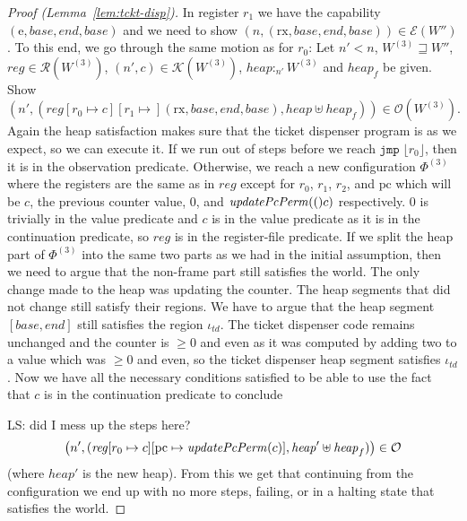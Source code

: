 \documentclass[a4paper]{article}
\newcommand{\update}[2]{[#1 \mapsto #2]}
\newcommand\lau[1]{{\color{purple} \sf \footnotesize {LS: #1}}\\}
\newcommand{\var}[1]{\mathit{#1}}
\newcommand{\pcreg}{\mathrm{pc}}
\newcommand{\reg}{\var{reg}}
\newcommand{\heap}{\var{heap}}
\newcommand{\plainfun}[2]{
  \ifthenelse{\equal{#2}{}}
             {\mathit{#1}}
             {\mathit{#1}(#2)}
}
\newcommand{\updatePcPerm}[1]{\plainfun{updatePcPerm}{#1}}
\newcommand{\future}{\mathbin{\sqsupseteq}}
\newcommand{\heapSat}[3][\heap]{#1 :_{#2} #3}
\newcommand{\asmType}{\plaindom{AsmType}}
\newcommand{\plaindom}[1]{\mathrm{#1}}
\newcommand{\intr}[2]{\mathcal{#1}}
\newcommand{\exprintr}[1]{\intr{E}{#1}}
\newcommand{\contintr}[1]{\intr{K}{#1}}
\newcommand{\regintr}[1]{\intr{R}{#1}}
\newcommand{\stder}{\exprintr{\asmType}}
\newcommand{\stdrr}{\regintr{\asmType}}
\newcommand{\stdkr}{\contintr{\asmType}}
\newcommand{\observations}{\mathcal{O}}
\newcommand{\npair}[2][n]{\left(#1,#2 \right)}
\newcommand{\refreg}[1]{\lfloor #1 \rfloor}
\newcommand{\zinstr}[1]{\mathtt{#1}}
\newcommand{\oneinstr}[2]{\zinstr{#1} \; #2}
\newcommand{\jmp}[1]{\oneinstr{jmp}{#1}}
\newcommand{\plainperm}[1]{\mathrm{#1}}
\newcommand{\exec}{\plainperm{rx}}
\newcommand{\entry}{\plainperm{e}}
\begin{document}
\begin{proof}[Proof (Lemma~\ref{lem:tckt-disp})]
In register $r_1$ we have the capability $(\entry,\var{base},\var{end},\var{base})$ and we need to show $\npair[n]{(\exec,\var{base},\var{end},\var{base})} \in \stder(W'')$. To this end, we go through the same motion as for $r_0$:  Let $n' < n$, $W^{(3)} \future W''$, $\reg \in \stdrr(W^{(3)})$, $\npair[n']{c} \in \stdkr(W^{(3)})$, $\heapSat[\heap]{n'}{W^{(3)}}$ and $\heap_f$ be given. Show 
\[
\npair[n']{(\reg[r_0 \mapsto c][r_1 \mapsto ](\exec,\var{base},\var{end},\var{base}), \heap \uplus \heap_f)} \in \observations(W^{(3)}).
\]
Again the heap satisfaction makes sure that the ticket dispenser program is as we expect, so we can execute it. If we run out of steps before we reach $\jmp{\refreg{r_0}}$, then it is in the observation predicate. Otherwise, we reach a new configuration $\Phi^{(3)}$ where the registers are the same as in $\reg$ except for $r_0$, $r_1$, $r_2$, and $\pcreg$ which will be $c$, the previous counter value, $0$, and $\updatePcPerm(c)$ respectively. $0$ is trivially in the value predicate and $c$ is in the value predicate as it is in the continuation predicate, so $\reg$ is in the register-file predicate. If we split the heap part of $\Phi^{(3)}$ into the same two parts as we had in the initial assumption, then we need to argue that the non-frame part still satisfies the world. The only change made to the heap was updating the counter. The heap segments that did not change still satisfy their regions. We have to argue that the heap segment $[\var{base},\var{end}]$ still satisfies the region $\iota_{\var{td}}$. The ticket dispenser code remains unchanged and the counter is $\geq 0$ and even as it was computed by adding two to a value which was $\geq 0$ and even, so the ticket dispenser heap segment satisfies $\iota_{\var{td}}$. Now we have all the necessary conditions satisfied to be able to use the fact that $c$ is in the continuation predicate to conclude 

\lau{did I mess up the steps here?}
\[
\npair[n']{(\reg\update{r_0}{c}\update{\pcreg}{\updatePcPerm{c}}, \heap' \uplus \heap_f)} \in \observations
\]
(where $\heap'$ is the new heap). From this we get that continuing from the configuration we end up with no more steps, failing, or in a halting state that satisfies the world.



\end{proof}
\end{document}
